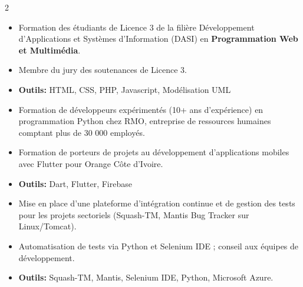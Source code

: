 \documentclass[10pt,a4paper,ragged2e,withhyper]{altacv}
\begin{document}
\begin{paracol}{2}
            \begin{itemize}
                \item Formation des étudiants de Licence 3 de la filière Développement d'Applications et Systèmes d'Information (DASI) en {\textbf{Programmation Web et Multimédia}}.
                \item Membre du jury des soutenances de Licence 3.
                \item \textcolor{SecondaryColor}{\textbf{Outils: }} HTML, CSS, PHP, Javascript, Modélisation UML
            \end{itemize}
            \divider

            \begin{itemize}
                \item Formation de développeurs expérimentés (10+ ans d'expérience) en programmation Python chez RMO, entreprise de ressources humaines comptant plus de 30 000 employés.
            \end{itemize}
            \divider
            
            \begin{itemize}
                \item Formation de porteurs de projets au développement d'applications mobiles avec Flutter pour Orange Côte d'Ivoire.
                \item \textcolor{SecondaryColor}{\textbf{Outils: }} Dart, Flutter, Firebase
            \end{itemize}

        \divider

        \begin{itemize}
            \item Mise en place d'une plateforme d'intégration continue et de gestion des tests pour les projets sectoriels (Squash-TM, Mantis Bug Tracker sur Linux/Tomcat).
            \item Automatisation de tests via Python et Selenium IDE ; conseil aux équipes de développement.
            \item \textcolor{SecondaryColor}{\textbf{Outils: }} Squash-TM, Mantis, Selenium IDE, Python, Microsoft Azure.
        \end{itemize}


\end{paracol}
\end{document}
